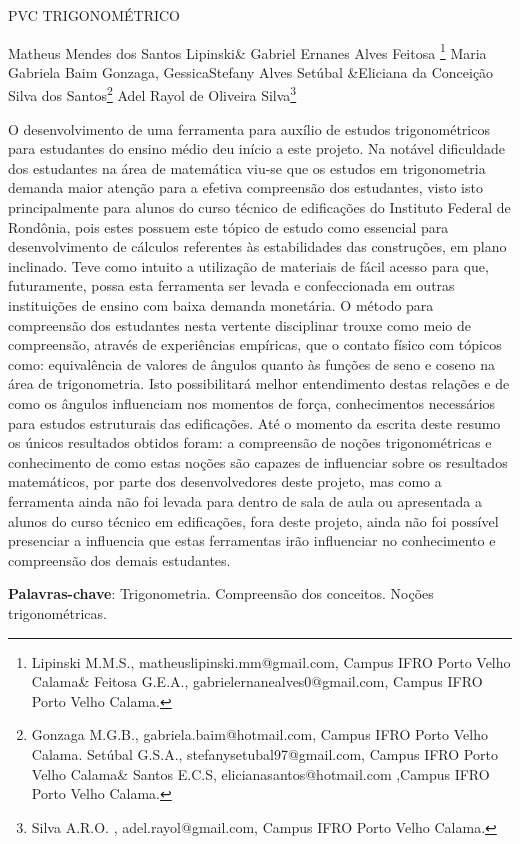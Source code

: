 \documentclass[article,12pt,onesidea,4paper,english,brazil]{abntex2}
\begin{document}
	
	
	\frenchspacing 
	
	\begin{center}
		\LARGE PVC TRIGONOMÉTRICO
		
		\normalsize
		Matheus Mendes dos Santos Lipinski\& Gabriel Ernanes Alves Feitosa \footnote{Lipinski M.M.S., matheuslipinski.mm@gmail.com, Campus IFRO Porto Velho Calama\&
			Feitosa G.E.A., gabrielernanealves0@gmail.com, Campus IFRO Porto Velho Calama.} 
		Maria Gabriela Baim Gonzaga, GessicaStefany Alves Setúbal \&Eliciana da Conceição Silva dos Santos\footnote{Gonzaga M.G.B., gabriela.baim@hotmail.com, Campus IFRO Porto Velho Calama.
			Setúbal G.S.A., stefanysetubal97@gmail.com, Campus IFRO Porto Velho Calama\&
			Santos E.C.S, elicianasantos@hotmail.com ,Campus IFRO Porto Velho Calama.} 
		Adel Rayol de Oliveira Silva\footnote{Silva A.R.O. , adel.rayol@gmail.com, Campus IFRO Porto Velho Calama.} 
	\end{center}
	
	\noindent O desenvolvimento de uma ferramenta para auxílio de estudos trigonométricos para estudantes do ensino médio deu início a este projeto. Na notável dificuldade dos estudantes na área de matemática viu-se que os estudos em trigonometria demanda maior atenção para a efetiva compreensão dos estudantes, visto isto principalmente para alunos do curso técnico de edificações do Instituto Federal de Rondônia, pois estes possuem este tópico de estudo como essencial para desenvolvimento de cálculos referentes às estabilidades das construções, em plano inclinado. Teve como intuito a utilização de materiais de fácil acesso para que, futuramente, possa esta ferramenta ser levada e confeccionada em outras instituições de ensino com baixa demanda monetária.  O método para compreensão dos estudantes nesta vertente disciplinar trouxe como meio de compreensão, através de experiências empíricas, que o contato físico com tópicos como: equivalência de valores de ângulos quanto às funções de seno e coseno na área de trigonometria. Isto possibilitará melhor entendimento destas relações e de como os ângulos influenciam nos momentos de força, conhecimentos necessários para estudos estruturais das edificações. Até o momento da escrita deste resumo os únicos resultados obtidos foram: a compreensão de noções trigonométricas e conhecimento de como estas noções são capazes de influenciar sobre os resultados matemáticos, por parte dos desenvolvedores deste projeto, mas como a ferramenta ainda não foi levada para dentro de sala de aula ou apresentada a alunos do curso técnico em edificações, fora deste projeto, ainda não foi possível presenciar a influencia que estas ferramentas irão influenciar no conhecimento e compreensão dos demais estudantes.
	
	\vspace{\onelineskip}
	
	\noindent
	\textbf{Palavras-chave}: Trigonometria. Compreensão dos conceitos. Noções trigonométricas.
	
\end{document}
